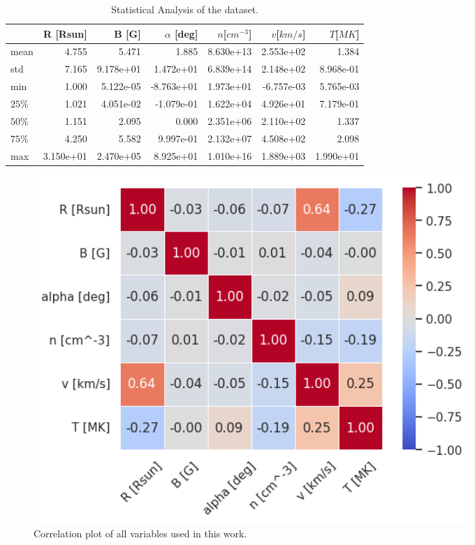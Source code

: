 \begin{table}[]
    \caption{Statistical Analysis of the dataset.}
    \label{tab:data_stats}
    \begin{tabular}{@{}lrrrrrr@{}}
    \toprule
           & R {[}Rsun{]} & B {[}G{]} & $\alpha$ {[}deg{]} & $n${[}$cm^{-3}${]} & $v${[}$km/s${]} & $T${[}$MK${]} \\ \midrule
    mean   & 4.755        & 5.471     & 1.885              & 8.630e+13 & 2.553e+02  & 1.384     \\
    std    & 7.165        & 9.178e+01 & 1.472e+01          & 6.839e+14 & 2.148e+02  & 8.968e-01 \\
    min    & 1.000        & 5.122e-05 & -8.763e+01         & 1.973e+01 & -6.757e-03 & 5.765e-03 \\
    $25\%$ & 1.021        & 4.051e-02 & -1.079e-01         & 1.622e+04 & 4.926e+01  & 7.179e-01 \\
    $50\%$ & 1.151        & 2.095     & 0.000              & 2.351e+06 & 2.110e+02  & 1.337     \\
    $75\%$ & 4.250        & 5.582     & 9.997e-01          & 2.132e+07 & 4.508e+02  & 2.098     \\
    max    & 3.150e+01    & 2.470e+05 & 8.925e+01          & 1.010e+16 & 1.889e+03  & 1.990e+01 \\ \bottomrule
    \end{tabular}
    \end{table}


\begin{figure}[h]
    \centering
    \includegraphics[width=0.8\textwidth]{figures/variables_corrplot.png}
    \caption{Correlation plot of all variables used in this work.}
    \label{fig:corrplot}
\end{figure}


